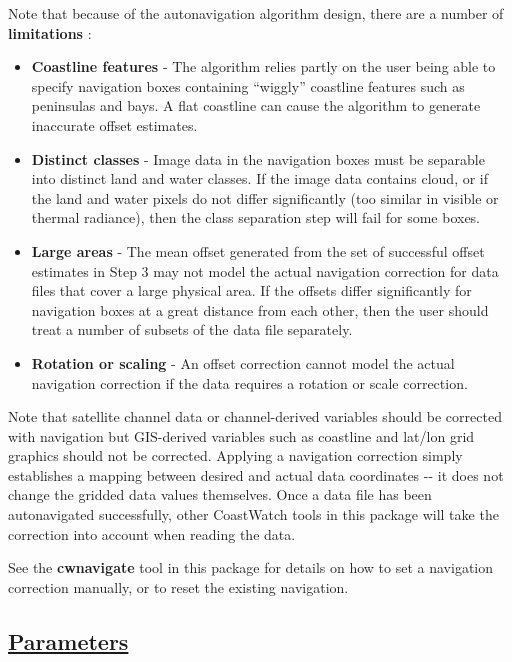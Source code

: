  Note that because of the autonavigation algorithm design, there are a number of \textbf{limitations}
: \begin{itemize}
\item \textbf{Coastline features}
 - The algorithm relies partly on the user being able to specify navigation boxes containing ``wiggly'' coastline features such as peninsulas and bays. A flat coastline can cause the algorithm to generate inaccurate offset estimates.
\item \textbf{Distinct classes}
 - Image data in the navigation boxes must be separable into distinct land and water classes. If the image data contains cloud, or if the land and water pixels do not differ significantly (too similar in visible or thermal radiance), then the class separation step will fail for some boxes.
\item \textbf{Large areas}
 - The mean offset generated from the set of successful offset estimates in Step 3 may not model the actual navigation correction for data files that cover a large physical area. If the offsets differ significantly for navigation boxes at a great distance from each other, then the user should treat a number of subsets of the data file separately.
\item \textbf{Rotation or scaling}
 - An offset correction cannot model the actual navigation correction if the data requires a rotation or scale correction.

\end{itemize}



 Note that satellite channel data or channel-derived variables should be corrected with navigation but GIS-derived variables such as coastline and lat/lon grid graphics should not be corrected. Applying a navigation correction simply establishes a mapping between desired and actual data coordinates -{-} it does not change the gridded data values themselves. Once a data file has been autonavigated successfully, other CoastWatch tools in this package will take the correction into account when reading the data.


 See the \textbf{cwnavigate}
 tool in this package for details on how to set a navigation correction manually, or to reset the existing navigation.
\subsection*{\underline{Parameters}}
